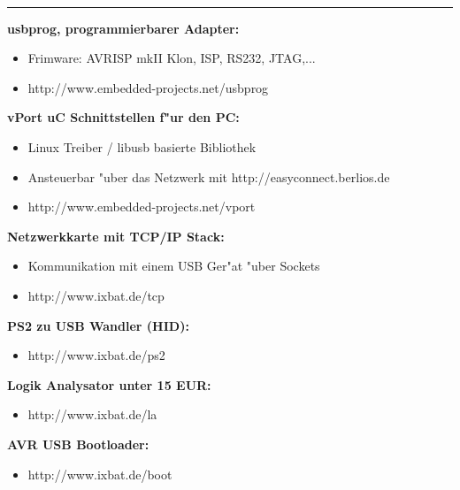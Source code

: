 \documentclass[11pt]{article}
\begin{document}
\begin{minipage}[t]{7cm}
\hfill {\Large{}}\\
\hrule
{}
\newline
\textbf{usbprog, programmierbarer Adapter:}
	\begin{itemize}
	\item Frimware: AVRISP mkII Klon, ISP, RS232, JTAG,...
	\item http://www.embedded-projects.net/usbprog
	\end{itemize}

\textbf{vPort uC Schnittstellen f"ur den PC:}
	\begin{itemize}
	\item Linux Treiber / libusb basierte Bibliothek
	\item Ansteuerbar "uber das Netzwerk mit http://easyconnect.berlios.de
	\item http://www.embedded-projects.net/vport
	\end{itemize}

\textbf{Netzwerkkarte mit TCP/IP Stack:}
  \begin{itemize}
	\item Kommunikation mit einem USB Ger"at "uber Sockets
	\item http://www.ixbat.de/tcp
	\end{itemize}

\textbf{PS2 zu USB Wandler (HID):}
	\begin{itemize}
	\item http://www.ixbat.de/ps2
	\end{itemize}

\textbf{Logik Analysator unter 15 EUR:}
	\begin{itemize}
	\item http://www.ixbat.de/la
	\end{itemize}

\textbf{AVR USB Bootloader:}
	\begin{itemize}
	\item http://www.ixbat.de/boot
	\end{itemize}

\end{minipage}


\newpage %
\end{document}
